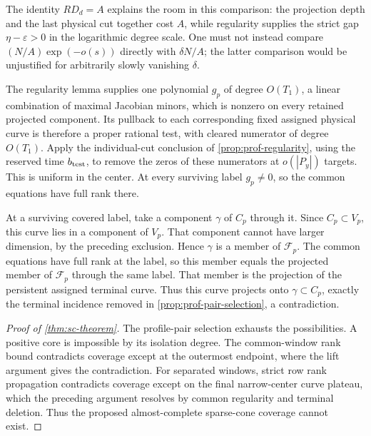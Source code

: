 The identity $RD_d=A$ explains the room in this comparison: the projection depth and the last physical cut together cost $A$, while regularity supplies the strict gap $\eta-\varepsilon>0$ in the logarithmic degree scale. One must not instead compare $(N/A)\exp(-o(s))$ directly with $\delta N/A$; the latter comparison would be unjustified for arbitrarily slowly vanishing $\delta$.

The regularity lemma supplies one polynomial $g_p$ of degree $O(T_1)$, a linear combination of maximal Jacobian minors, which is nonzero on every retained projected component.  Its pullback to each corresponding fixed assigned physical curve is therefore a proper rational test, with cleared numerator of degree $O(T_1)$.  Apply the individual-cut conclusion of \cref{prop:prof-regularity}, using the reserved time $b_{\rm test}$, to remove the zeros of these numerators at $o(|P_y|)$ targets.  This is uniform in the center.  At every surviving label $g_p\ne0$, so the common equations have full rank there.

At a surviving covered label, take a component $\gamma$ of $C_p$ through it.  Since $C_p\subset V_p$, this curve lies in a component of $V_p$.  That component cannot have larger dimension, by the preceding exclusion.  Hence $\gamma$ is a member of $\mathcal{F}_p$.  The common equations have full rank at the label, so this member equals the projected member of $\mathcal{F}_p$ through the same label. That member is the projection of the persistent assigned terminal curve. Thus this curve projects onto $\gamma\subset C_p$, exactly the terminal incidence removed in \cref{prop:prof-pair-selection}, a contradiction.

\begin{proof}[Proof of \cref{thm:sc-theorem}]
The profile-pair selection exhausts the possibilities. A positive core is impossible by its isolation degree. The common-window rank bound contradicts coverage except at the outermost endpoint, where the lift argument gives the contradiction.  For separated windows, strict row rank propagation contradicts coverage except on the final narrow-center curve plateau, which the preceding argument resolves by common regularity and terminal deletion.  Thus the proposed almost-complete sparse-cone coverage cannot exist.
\end{proof}
